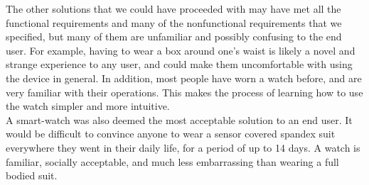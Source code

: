 \documentclass[12pt, titlepage]{article}
\begin{document}
\begin{enumerate}
The other solutions that we could have proceeded with may have met all the functional requirements and many of the nonfunctional requirements that we specified, but many of them are unfamiliar and possibly confusing to the end user. For example, having to wear a box around one's waist is likely a novel and strange experience to any user, and could make them uncomfortable with using the device in general. In addition, most people have worn a watch before, and are very familiar with their operations. This makes the process of learning how to use the watch simpler and more intuitive.\\

A smart-watch was also deemed the most acceptable solution to an end user. It would be difficult to convince anyone to wear a sensor covered spandex suit everywhere they went in their daily life, for a period of up to 14 days. A watch is familiar, socially acceptable, and much less embarrassing than wearing a full bodied suit.

\end{enumerate}
\end{document}
